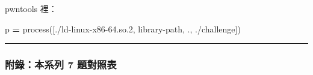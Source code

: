 \documentclass[10pt,a4paper]{article}
\newenvironment{Shaded}{\begin{snugshade}}{\end{snugshade}}
\newcommand{\NormalTok}[1]{#1}
\newcommand{\OperatorTok}[1]{\textcolor[rgb]{0.81,0.36,0.00}{\textbf{#1}}}
\newcommand{\StringTok}[1]{\textcolor[rgb]{0.31,0.60,0.02}{#1}}
\renewenvironment{Shaded}{%
  \def\FrameCommand{\fboxsep=3.2pt\colorbox{shadecolor}}%
  \MakeFramed{\advance\hsize-\width\FrameRestore\small}%
}{%
  \endMakeFramed
}
\begin{document}
pwntools 裡：

\begin{Shaded}
\begin{Highlighting}[]
\NormalTok{p }\OperatorTok{=}\NormalTok{ process([}\StringTok{\textquotesingle{}./ld{-}linux{-}x86{-}64.so.2\textquotesingle{}}\NormalTok{, }\StringTok{\textquotesingle{}{-}{-}library{-}path\textquotesingle{}}\NormalTok{, }\StringTok{\textquotesingle{}.\textquotesingle{}}\NormalTok{, }\StringTok{\textquotesingle{}./challenge\textquotesingle{}}\NormalTok{])}
\end{Highlighting}
\end{Shaded}

\begin{center}\rule{0.5\linewidth}{0.5pt}\end{center}

\subsubsection{附錄：本系列 7
題對照表}\label{ux9644ux9304ux672cux7cfbux5217-7-ux984cux5c0dux7167ux8868}
\end{document}

